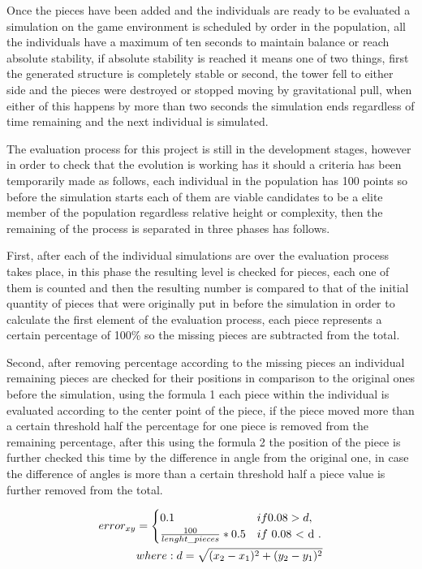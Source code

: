 \documentclass[graybox]{svmult}
\begin{document}
Once the pieces have been added and the individuals are ready to be evaluated a simulation on the game environment is scheduled by order in the population, all the individuals have a maximum of ten seconds to maintain balance or reach absolute stability, if absolute stability is reached it means one of two things, first the generated structure is completely stable or second, the tower fell to either side and the pieces were destroyed or stopped moving by gravitational pull, when either of this happens by more than two seconds the simulation ends regardless of time remaining and the next individual is simulated.

The evaluation process for this project is still in the development stages, however in order to check that the evolution is working has it should a criteria has been temporarily made as follows, each individual in the population has 100 points so before the simulation starts each of them are viable candidates to be a elite member of the population regardless relative height or complexity, then the remaining of the process is separated in three phases has follows.

First, after each of the individual simulations are over the evaluation process takes place, in this phase the resulting level is checked for pieces, each one of them is counted and then the resulting number is compared to that of the initial quantity of pieces that were originally put in before the simulation in order to calculate the first element of the evaluation process, each piece represents a certain percentage of 100\% so the missing pieces are subtracted from the total.

Second, after removing percentage according to the missing pieces an individual remaining pieces are checked for their positions in comparison to the original ones before the simulation, using the formula 1 each piece within the individual is evaluated according to the center point of the piece, if the piece moved more than a certain threshold half the percentage for one piece is removed from the remaining percentage, after this using the formula 2 the position of the piece is further checked this time by the difference in angle from the original one, in case the difference of angles is more than a certain threshold half a piece value is further removed from the total.

\begin{equation}
    \begin{aligned}
        error_{xy} =
            \begin{cases}
                0.1 & if 0.08 > d, \\
                \frac{100}{lenght\_pieces} * 0.5 & if $ 0.08 < d $.
            \end{cases} \\
        where: d=\sqrt{(x_2 - x_1)^2 + (y_2 - y_1)^2}    
    \end{aligned}
\end{equation}
\end{document}
